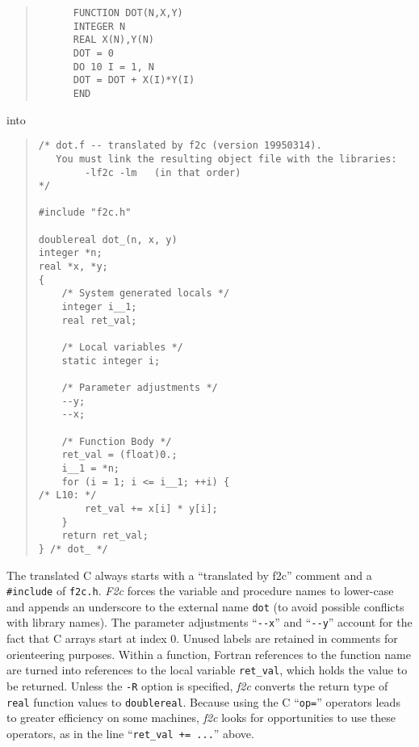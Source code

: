 \documentclass[12pt]{article}
\begin{document}
\begin{quote}
\begin{verbatim}
      FUNCTION DOT(N,X,Y)
      INTEGER N
      REAL X(N),Y(N)
      DOT = 0
      DO 10 I = 1, N
      DOT = DOT + X(I)*Y(I)
      END
\end{verbatim}
\end{quote}
into
\begin{quote}
\begin{verbatim}
/* dot.f -- translated by f2c (version 19950314).
   You must link the resulting object file with the libraries:
        -lf2c -lm   (in that order)
*/

#include "f2c.h"

doublereal dot_(n, x, y)
integer *n;
real *x, *y;
{
    /* System generated locals */
    integer i__1;
    real ret_val;

    /* Local variables */
    static integer i;

    /* Parameter adjustments */
    --y;
    --x;

    /* Function Body */
    ret_val = (float)0.;
    i__1 = *n;
    for (i = 1; i <= i__1; ++i) {
/* L10: */
        ret_val += x[i] * y[i];
    }
    return ret_val;
} /* dot_ */
\end{verbatim}
\end{quote}
The translated C always starts with a ``translated by f2c'' comment and a \verb|#include| of \verb|f2c.h|. \emph{F2c} forces the variable and procedure names to lower-case and appends an underscore to the external name \verb|dot| (to avoid possible conflicts with library names). The parameter adjustments ``\verb|--x|'' and ``\verb|--y|'' account for the fact that C arrays start at index 0. Unused labels are retained in comments for orienteering purposes. Within a function, Fortran references to the function name are turned into references to the local variable \verb|ret_val|, which holds the value to be returned. Unless the \verb|-R| option is specified, \emph{f2c} converts the return type of \verb|real| function values to \verb|doublereal|. Because using the C ``\verb|op=|'' operators leads to greater efficiency on some machines, \emph{f2c} looks for opportunities to use these operators, as in the line ``\verb|ret_val += ...|'' above.
\end{document}
